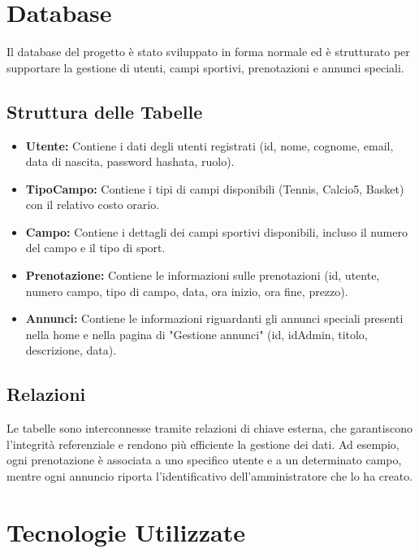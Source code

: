 \documentclass{article}
\begin{document}
\section{Database}

Il database del progetto è stato sviluppato in forma normale ed è strutturato per supportare la gestione di utenti, campi sportivi, prenotazioni e annunci speciali.

\subsection{Struttura delle Tabelle}

\begin{itemize}
    \item \textbf{Utente:} Contiene i dati degli utenti registrati (id, nome, cognome, email, data di nascita, password hashata, ruolo).
    
    \item \textbf{TipoCampo:} Contiene i tipi di campi disponibili (Tennis, Calcio5, Basket) con il relativo costo orario.
    
    \item \textbf{Campo:} Contiene i dettagli dei campi sportivi disponibili, incluso il numero del campo e il tipo di sport.
    
    \item \textbf{Prenotazione:} Contiene le informazioni sulle prenotazioni (id, utente, numero campo, tipo di campo, data, ora inizio, ora fine, prezzo).

    \item \textbf{Annunci:} Contiene le informazioni riguardanti gli annunci speciali presenti nella home e nella pagina di "Gestione annunci" (id, idAdmin, titolo, descrizione, data).
\end{itemize}

\subsection{Relazioni}

Le tabelle sono interconnesse tramite relazioni di chiave esterna, che garantiscono l’integrità referenziale e rendono più efficiente la gestione dei dati. Ad esempio, ogni prenotazione è associata a uno specifico utente e a un determinato campo, mentre ogni annuncio riporta l’identificativo dell’amministratore che lo ha creato.


\section{Tecnologie Utilizzate}
\end{document}
